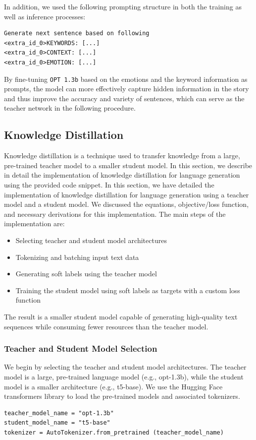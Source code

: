 \documentclass{article} %
\begin{document}
In addition, we used the following prompting structure in both the training as well as inference processes:
\begin{lstlisting}
Generate next sentence based on following 
<extra_id_0>KEYWORDS: [...]
<extra_id_0>CONTEXT: [...]
<extra_id_0>EMOTION: [...]
\end{lstlisting}

By fine-tuning \texttt{OPT 1.3b} based on the emotions and the keyword information as prompts, the model can more effectively capture hidden information in the story and thus improve the accuracy and variety of sentences, which can serve as the teacher network in the following procedure.


\subsection{Knowledge Distillation}
Knowledge distillation is a technique used to transfer knowledge from a large, pre-trained teacher model to a smaller student model. In this section, we describe in detail the implementation of knowledge distillation for language generation using the provided code snippet. In this section, we have detailed the implementation of knowledge distillation for language generation using a teacher model and a student model. We discussed the equations, objective/loss function, and necessary derivations for this implementation. The main steps of the implementation are:
\begin{itemize}
    \item Selecting teacher and student model architectures
    \item Tokenizing and batching input text data
    \item Generating soft labels using the teacher model
    \item Training the student model using soft labels as targets with a custom loss function
\end{itemize}

The result is a smaller student model capable of generating high-quality text sequences while consuming fewer resources than the teacher model.

\subsubsection{Teacher and Student Model Selection}
We begin by selecting the teacher and student model architectures. The teacher model is a large, pre-trained language model (e.g., opt-1.3b), while the student model is a smaller architecture (e.g., t5-base). We use the Hugging Face transformers library to load the pre-trained models and associated tokenizers.
\begin{lstlisting}
teacher_model_name = "opt-1.3b"
student_model_name = "t5-base"
tokenizer = AutoTokenizer.from_pretrained (teacher_model_name)
\end{lstlisting}
\end{document}

